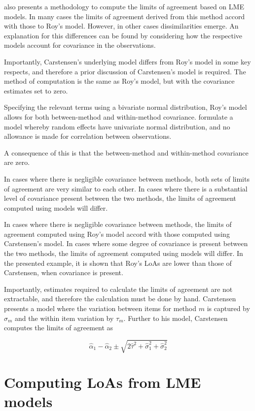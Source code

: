 \documentclass[12pt, a4paper]{report}
\theoremstyle{plain}
\theoremstyle{definition}
\theoremstyle{remark}
\begin{document}
\citet{BXC2008} also presents a methodology to compute the limits of agreement based on LME models. In many cases the limits of agreement derived from this method accord with those to Roy's model. However, in other cases dissimilarities emerge. An explanation for this differences can be found by considering how the respective models account for covariance in the observations. 

Importantly, Carstensen's underlying model differs from Roy's model in some key respects, and therefore a prior discussion of Carstensen's model is required.
The method of computation is the same as Roy's model, but with the covariance estimates set to zero.

Specifying the relevant terms using a bivariate normal distribution, Roy's model allows for both between-method and within-method covariance. \citet{BXC2008} formulate a model whereby random effects have univariate normal distribution, and no allowance is made for correlation between observations.

A consequence of this is that the between-method and within-method covariance are zero. 

In cases where there is negligible covariance between methods, both sets of limits of agreement are very similar to each other. In cases where there is a substantial level of covariance present between the two methods, the limits of agreement computed using models will differ.

In cases where there is negligible covariance between methods, the limits of agreement computed using Roy's model accord with those computed using Carstensen's model. In cases where some degree of covariance is present between the two methods, the limits of agreement computed using models will differ. In the presented example, it is shown that Roy's LoAs are lower than those of Carstensen, when covariance is present. 

Importantly, estimates required to calculate the limits of agreement are not extractable, and therefore the calculation must be done by hand. Carstensen presents a model where the variation between items for
method $m$ is captured by $\sigma_m$ and the within item variation
by $\tau_m$. 	Further to his model, Carstensen computes the limits of agreement
as

\[
\hat{\alpha}_1 - \hat{\alpha}_2 \pm \sqrt{2 \hat{\tau}^2 +
	\hat{\sigma}^2_1 + \hat{\sigma}^2_2}
\]



\section{Computing LoAs from LME models}
\end{document}
